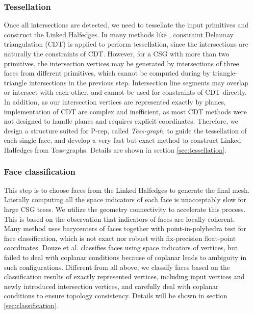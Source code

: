 \documentclass[10pt,journal,compsoc]{IEEEtran}
\begin{document}
\subsubsection{Tessellation}

Once all intersections are detected, we need to tessellate the input primitives and construct the Linked Halfedges. In many methods like \cite{ogayar2015deferred}, constraint Delaunay triangulation (CDT) is applied to perform tessellation, since the intersections are naturally the constraints of CDT. However, for a CSG with more than two primitives, the intersection vertices may be generated by intersections of three faces from different primitives, which cannot be computed during by triangle-triangle intersections in the previous step. Intersection line segments may overlap or intersect with each other, and cannot be used for constraints of CDT directly. In addition, as our intersection vertices are represented exactly by planes, implementation of CDT are complex and inefficient, as most CDT methods were not designed to handle planes and requires explicit coordinates. Therefore, we design a structure suited for P-rep, called \emph{Tess-graph}, to guide the tessellation of each single face, and develop a very fast but exact method to construct Linked Halfedges from Tess-graphs. Details are shown in section \ref{sec:tessellation}.

\subsubsection{Face classification}

This step is to choose faces from the Linked Halfedges to generate the final mesh. Literally computing all the space indicators of each face is unacceptably slow for large CSG trees. We utilize the geometry connectivity to accelerate this process. This is based on the observation that indicators of faces are locally coherent. Many method uses barycenters of faces together with point-in-polyhedra test for face classification, which is not exact nor robust with fix-precision float-point coordinates. Douze et al. \cite{douze2015quickcsg} classifies faces using space indicators of vertices, but failed to deal with coplanar conditions because of coplanar leads to ambiguity in such configurations. Different from all above, we classify faces based on the classification results of exactly represented vertices, including input vertices and newly introduced intersection vertices, and carefully deal with coplanar conditions to ensure topology consistency. Details will be shown in section \ref{sec:classification}.
\end{document}
